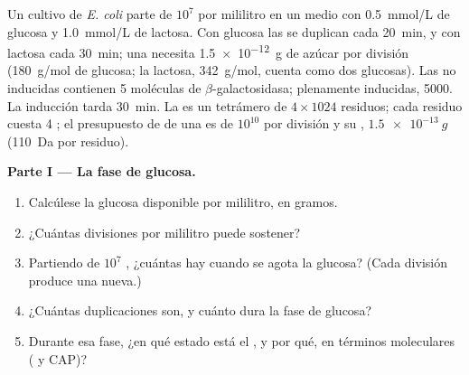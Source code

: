 \begin{problem}
\label{pb:b1:expression-control:1}
Un cultivo de \emph{E. coli} parte de $10^7$  por mililitro en un
medio con \qty{0.5}{mmol/L} de glucosa y \qty{1.0}{mmol/L} de lactosa. Con
glucosa las  se duplican cada \qty{20}{min}, y con lactosa cada
\qty{30}{min}; una  necesita \qty{1.5e-12}{g} de azúcar por división
(\qty{180}{g/mol} de glucosa; la lactosa, \qty{342}{g/mol}, cuenta como dos
glucosas). Las  no inducidas contienen 5 moléculas de
$\beta$-galactosidasa; plenamente inducidas, \num{5000}. La inducción tarda
\qty{30}{min}. La  es un tetrámero de $4\times 1024$ residuos; cada
residuo cuesta 4 ; el presupuesto de  de una  es de $10^{10}$
por división y su , $\qty{1.5e-13}{g}$ (\qty{110}{Da} por residuo).

\medskip
\noindent\textbf{Parte I --- La fase de glucosa.}
\begin{enumerate}
  \item Calcúlese la glucosa disponible por mililitro, en gramos.
  \item ¿Cuántas divisiones por mililitro puede sostener?
  \item Partiendo de $10^7$ , ¿cuántas hay cuando se agota la
        glucosa? (Cada división produce una  nueva.)
  \item ¿Cuántas duplicaciones son, y cuánto dura la fase de glucosa?
  \item Durante esa fase, ¿en qué estado está el , y por qué, en
        términos moleculares ( y CAP)?
\end{enumerate}


\end{problem}
